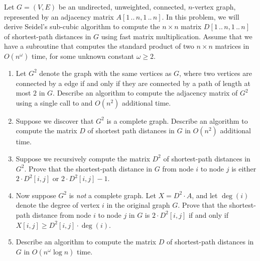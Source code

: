 \begin{exercises}
\item {} Let $G = (V, E)$ be an undirected, unweighted, connected, $n$-vertex graph, represented by an adjacency matrix $A[1\,..\,n, 1\,..\,n]$.
In this problem, we will derive Seidel’s sub-cubic algorithm to compute the $n \times n$ matrix $D[1\,..\,n, 1\,..\,n]$ of shortest-path distances in $G$ using fast matrix multiplication.
Assume that we have a subroutine  that computes the standard product of two $n \times n$ matrices in $O(n^\omega)$ time, for some unknown constant $\omega \ge 2$.
\begin{enumerate}
\item Let $G^2$ denote the graph with the same vertices as $G$, where two vertices are connected by a edge if and only if they are connected by a path of length at most $2$ in $G$.
Describe an algorithm to compute the adjacency matrix of $G^2$ using a single call to  and $O(n^2)$ additional time.
\item Suppose we discover that $G^2$ is a complete graph.
Describe an algorithm to compute the matrix $D$ of shortest path distances in $G$ in $O(n^2)$ additional time.
\item Suppose we recursively compute the matrix $D^2$ of shortest-path distances in $G^2$.
Prove that the shortest-path distance in $G$ from node $i$ to node $j$ is either $2 \cdot D^2[i, j]$ or $2 \cdot D^2[i, j] - 1$.
\item Now suppose $G^2$ is \textit{not} a complete graph.
Let $X = D^2 \cdot A$, and let $\deg(i)$ denote the degree of vertex $i$ in the original graph $G$.
Prove that the shortest-path distance from node $i$ to node $j$ in $G$ is $2 \cdot D^2[i, j]$ if and only if $X[i, j] \ge D^2[i, j] \cdot \deg(i)$.
\item Describe an algorithm to compute the matrix $D$ of shortest-path distances in $G$ in $O(n^\omega \log n)$ time.
\end{enumerate}


\end{exercises}
